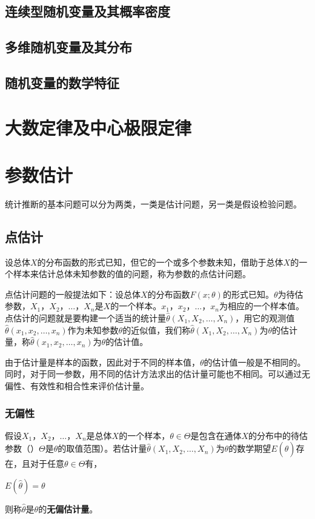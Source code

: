 \documentclass[11pt]{book}
\newcounter{#2}
\newcounter{#2}[#1]
\numberwithin{#2}{#1}
\begin{document}
	\section{连续型随机变量及其概率密度}
	\section{多维随机变量及其分布}
	\section{随机变量的数学特征}
	\chapter{大数定律及中心极限定律}
	\chapter{参数估计}
	统计推断的基本问题可以分为两类，一类是估计问题，另一类是假设检验问题。
	\section{点估计}
	\begin{newdef}
		设总体$X$的分布函数的形式已知，但它的一个或多个参数未知，借助于总体$X$的一个样本来估计总体未知参数的值的问题，称为参数的点估计问题。
	\end{newdef}
点估计问题的一般提法如下：设总体$X$的分布函数$F(x;\theta)$的形式已知。$\theta$为待估参数，$X_1$，$X_2$，$\dots$，$X_n$是$X$的一个样本。$x_1$，$x_2$，$\dots$，$x_n$为相应的一个样本值。点估计的问题就是要构建一个适当的统计量$\hat{\theta}(X_1,X_2,\dots,X_n)$，用它的观测值$\hat{\theta}(x_1,x_2,\dots,x_n)$作为未知参数$\theta$的近似值，我们称$\hat{\theta}(X_1,X_2,\dots,X_n)$为$\theta$的估计量，称$\hat{\theta}(x_1,x_2,\dots,x_n)$为$\theta$的估计值。

由于估计量是样本的函数，因此对于不同的样本值，$\theta$的估计值一般是不相同的。同时，对于同一参数，用不同的估计方法求出的估计量可能也不相同。可以通过无偏性、有效性和相合性来评价估计量。
\subsection{无偏性}
\begin{newdef}
	假设$X_1$，$X_2$，$\dots$，$X_n$是总体$X$的一个样本，$\theta\in\Theta$是包含在通体$X$的分布中的待估参数（）$\Theta$是$\theta$的取值范围）。若估计量$\hat{\theta}(X_1,X_2,\dots,X_n)$为$\theta$的数学期望$E(\hat{\theta})$存在，且对于任意$\theta\in\Theta$有，
	\begin{center}
		$E(\hat{\theta})=\theta$
	\end{center}
则称$\hat{\theta}$是$\theta$的\textbf{无偏估计量}。
\end{newdef}
\end{document}
